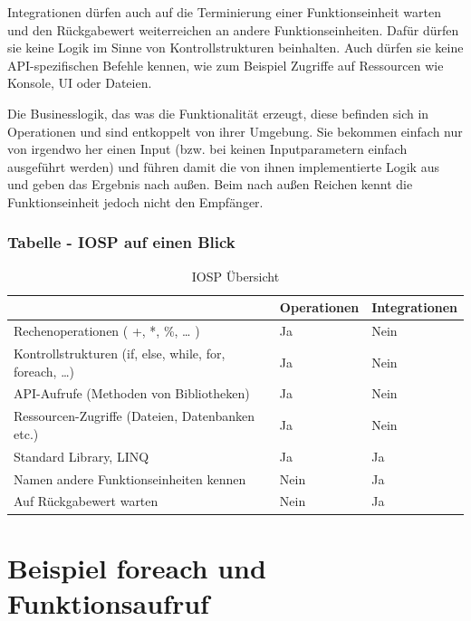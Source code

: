 \begin{enumerate}
Integrationen dürfen auch auf die Terminierung einer Funktionseinheit warten und den Rückgabewert  weiterreichen an andere Funktionseinheiten.
Dafür dürfen sie keine Logik im Sinne von Kontrollstrukturen beinhalten.
Auch dürfen sie keine API-spezifischen Befehle kennen, wie zum Beispiel Zugriffe
auf Ressourcen wie Konsole, UI oder Dateien.

Die Businesslogik, das was die Funktionalität erzeugt, diese befinden sich in Operationen und sind entkoppelt von ihrer Umgebung.
Sie bekommen einfach nur von irgendwo her einen Input (bzw. bei keinen Inputparametern einfach ausgeführt werden) und führen damit die von ihnen implementierte
Logik aus und geben das Ergebnis nach außen. Beim nach außen Reichen kennt die Funktionseinheit jedoch nicht den Empfänger.
\end{enumerate}

\subsubsection{Tabelle -  IOSP auf einen Blick}


\bigskip
\begin{table}[H]
	\centering
\begin{tabularx}{\textwidth}{|X|l|l|}
	\hline
 & Operationen & Integrationen\\
\hline
Rechenoperationen ( +, *, \%, \ldots{} ) & Ja & Nein\\ \hline
Kontrollstrukturen (if, else, while, for, foreach, \ldots{}) & Ja & Nein\\ \hline
API-Aufrufe (Methoden von Bibliotheken) & Ja & Nein\\ \hline
Ressourcen-Zugriffe (Dateien, Datenbanken etc.) & Ja & Nein\\ \hline
Standard Library, LINQ & Ja & Ja\\ \hline
Namen andere Funktionseinheiten kennen & Nein & Ja\\ \hline
Auf Rückgabewert warten & Nein & Ja\\ \hline
\end{tabularx}
	\medskip
	\caption{IOSP Übersicht}
\end{table}



\section{Beispiel foreach und Funktionsaufruf}




